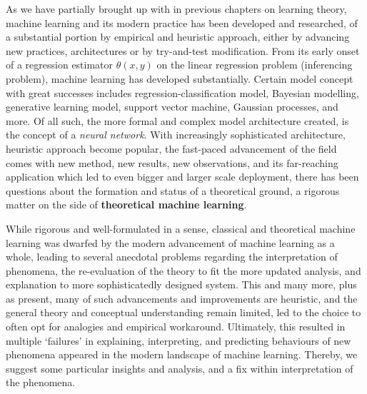 As we have partially brought up with in previous chapters on learning theory, machine learning and its modern practice has been developed and researched, of a substantial portion by empirical and heuristic approach, either by advancing new practices, architectures or by try-and-test modification. From its early onset of a regression estimator $\theta(x,y)$ on the linear regression problem (inferencing problem), machine learning has developed substantially. Certain model concept with great successes includes regression-classification model, Bayesian modelling, generative learning model, support vector machine, Gaussian processes, and more. Of all such, the more formal and complex model architecture created, is the concept of a \textit{neural network}. With increasingly sophisticated architecture, heuristic approach become popular, the fast-paced advancement of the field comes with new method, new results, new observations, and its far-reaching application which led to even bigger and larger scale deployment, there has been questions about the formation and status of a theoretical ground, a rigorous matter on the side of \textbf{theoretical machine learning}.

While rigorous and well-formulated in a sense, classical and theoretical machine learning was dwarfed by the modern advancement of machine learning as a whole, leading to several anecdotal problems regarding the interpretation of phenomena, the re-evaluation of the theory to fit the more updated analysis, and explanation to more sophisticatedly designed system. This and many more, plus as present, many of such advancements and improvements are heuristic, and the general theory and conceptual understanding remain limited, led to the choice to often opt for analogies and empirical workaround. Ultimately, this resulted in multiple `failures' in explaining, interpreting, and predicting behaviours of new phenomena appeared in the modern landscape of machine learning. Thereby, we suggest some particular insights and analysis, and a fix within interpretation of the phenomena. 

